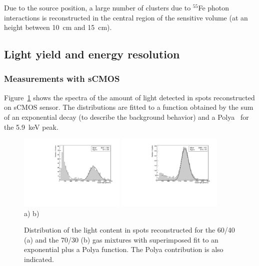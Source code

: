 \documentclass[a4paper,11pt]{article}
\begin{document}
Due to the source position, 
a large number of clusters due to $^{55}$Fe photon interactions
is reconstructed in the central region of the sensitive volume 
(at an height between 10~cm and 15~cm).

\subsection{Light yield and energy resolution}

\subsubsection{Measurements with sCMOS}

Figure~\ref{fig:peaks} shows the spectra of the amount of light detected in spots reconstructed on sCMOS sensor.
The distributions are fitted to a function obtained by the sum of an exponential decay (to describe the background behavior) 
and a Polya~\cite{bib:rolandiblum} for the 5.9~keV peak.

\begin{figure}[ht]
\centering
\includegraphics[width=0.45\textwidth]{Figures/DB_Integral_6040.pdf}
\includegraphics[width=0.45\textwidth]{Figures/DB_Integral_7030.pdf}\\
\vspace{-0.3cm}
\mbox{a)} \hspace{6.5cm} \mbox{b)}
\vspace{-0.3cm}

\caption{Distribution of the light content in spots reconstructed for the 60/40 (a) and the 70/30 (b) gas mixtures with superimposed fit to an exponential plus a Polya function. The Polya contribution is also indicated.} 

\label{fig:peaks}
\end{figure}
\end{document}

